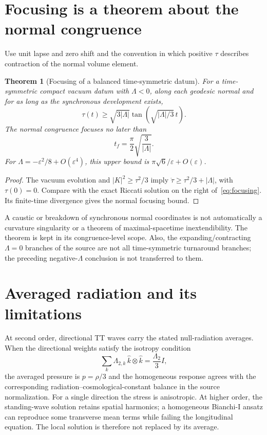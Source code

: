 \documentclass[11pt,a4paper,oneside]{book}
\theoremstyle{plain}
\newtheorem{theorem}{Theorem}[chapter]
\theoremstyle{definition}
\theoremstyle{remark}
\newcommand{\src}[2]{\cite{#1}}
\begin{document}
\section{Focusing is a theorem about the normal congruence}
Use unit lapse and zero shift and the convention in which positive $\tau$ describes contraction of the normal volume element.

\begin{theorem}[Focusing of a balanced time-symmetric datum]
\label{thm:focusing}
For a time-symmetric compact vacuum datum with $\Lambda<0$, along each geodesic normal and for as long as the synchronous development exists,
\begin{equation}
 \tau(t)\ge\sqrt{3|\Lambda|}
 \tan\!\left(\sqrt{|\Lambda|/3}\,t\right).
 \label{eq:focusing}
\end{equation}
The normal congruence focuses no later than
\begin{equation}
 t_f=\frac\pi2\sqrt{\frac3{|\Lambda|}}.
 \label{eq:focusing-time}
\end{equation}
For $\Lambda=-\varepsilon^2/8+O(\varepsilon^4)$, this upper bound is $\pi\sqrt6/\varepsilon+O(\varepsilon)$.
\end{theorem}
\begin{proof}
The vacuum evolution and $|K|^2\ge\tau^2/3$ imply $\dot\tau\ge\tau^2/3+|\Lambda|$, with $\tau(0)=0$. Compare with the exact Riccati solution on the right of~\eqref{eq:focusing}. Its finite-time divergence gives the normal focusing bound.
\end{proof}
\src{R19}{thm:v19v92-focusing}
A caustic or breakdown of synchronous normal coordinates is not automatically a curvature singularity or a theorem of maximal-spacetime inextendibility. The theorem is kept in its congruence-level scope. Also, the expanding/contracting $\Lambda=0$ branches of the source are not all time-symmetric turnaround branches; the preceding negative-$\Lambda$ conclusion is not transferred to them.

\section{Averaged radiation and its limitations}
At second order, directional TT waves carry the stated null-radiation averages. When the directional weights satisfy the isotropy condition
\begin{equation}
 \sum_k\Lambda_{2,k}\,\widehat k\otimes\widehat k
 =\frac{\Lambda_2}{3}I,
 \label{eq:isotropic-wave}
\end{equation}
the averaged pressure is $p=\rho/3$ and the homogeneous response agrees with the corresponding radiation--cosmological-constant balance in the source normalization. For a single direction the stress is anisotropic. At higher order, the standing-wave solution retains spatial harmonics; a homogeneous Bianchi-I ansatz can reproduce some transverse mean terms while failing the longitudinal equation. The local solution is therefore not replaced by its average. \cite{R19}
\end{document}
